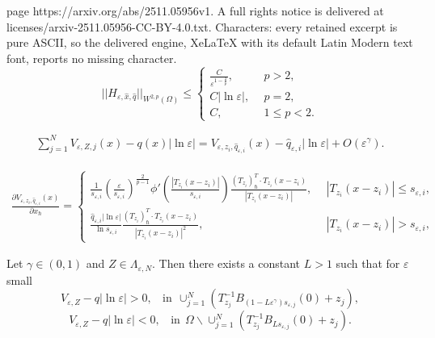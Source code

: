 \documentclass[10pt,a4paper]{amsart}
\begin{document}
page https://arxiv.org/abs/2511.05956v1. A full rights notice is delivered at licenses/arxiv-2511.05956-CC-BY-4.0.txt. Characters: every retained excerpt is pure ASCII, so the delivered engine, XeLaTeX with its default Latin Modern text font, reports no missing character.
\begin{equation}\label{3-001}
||H_{\varepsilon, \hat{x}, \hat{q}}||_{W^{2,p}(\Omega)}\leq
\begin{cases}
\frac{C}{\varepsilon^{1-\frac{2}{p}}},\ \ &p>2,\\
C|\ln\varepsilon|,\ \ &p=2,\\
C,\ \ &1\leq p<2.
\end{cases}
\end{equation}

\begin{equation}\label{203}
\begin{split}
\sum_{j=1}^NV_{\varepsilon, Z,j}(x)-q(x)|\ln\varepsilon|=V_{\varepsilon, z_i, \hat{q}_{\varepsilon,i}}(x)-\hat{q}_{\varepsilon,i}|\ln\varepsilon|+O\left( \varepsilon^\gamma\right).
\end{split}
\end{equation}

\begin{equation}\label{200}
\begin{split}
\frac{\partial V_{\varepsilon, z_i, \hat{q}_{\varepsilon,i}}(x)}{\partial x_\hbar}=\begin{cases}
\frac{1}{s_{\varepsilon,i}}(\frac{\varepsilon}{s_{\varepsilon,i}})^{\frac{2}{p-1}}\phi'(\frac{|T_{z_i}(x-z_i)|}{s_{\varepsilon,i}})\frac{(T_{z_i})_\hbar^T\cdot T_{z_i}(x-z_i)}{|T_{z_i}(x-z_i)|},\ \ &|T_{z_i}(x-z_i)|\leq s_{\varepsilon,i},\\
\frac{\hat{q}_{\varepsilon,i}|\ln\varepsilon|}{\ln s_{\varepsilon,i}}\frac{(T_{z_i})_\hbar^T\cdot T_{z_i}(x-z_i)}{|T_{z_i}(x-z_i)|^2},\ \ &|T_{z_i}(x-z_i)|> s_{\varepsilon,i},
\end{cases}
\end{split}
\end{equation}

\begin{lemma}\label{lemA-5}
	Let $\gamma\in(0,1)$ and $ Z\in \Lambda_{\varepsilon, N} $. Then there exists a constant $ L > 1 $ such that for $ \varepsilon $ small
	\begin{equation*}
	V_{\varepsilon,Z}-q|\ln\varepsilon|>0,\ \ \  \ \text{in}\ \   \cup_{j=1}^N\left( T_{z_j}^{-1}B_{\left( 1-L \varepsilon^\gamma \right) s_{\varepsilon,j}}(0)+z_j\right),
	\end{equation*}
	\begin{equation*}
	V_{\varepsilon,Z}-q|\ln\varepsilon|<0,\ \ \  \ \text{in}\ \  \Omega\backslash\cup_{j=1}^N\left( T_{z_j}^{-1}B_{Ls_{\varepsilon,j}}(0)+z_j\right).
	\end{equation*}
	
\end{lemma}
\end{document}
